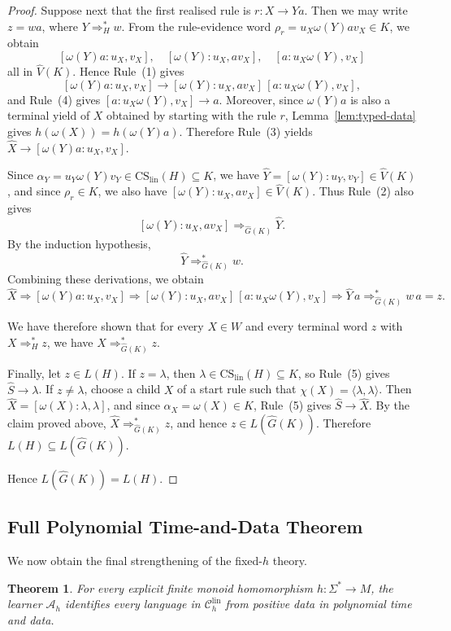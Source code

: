 \documentclass[11pt,a4paper]{article}
\newtheorem{theorem}{Theorem}[section]
\newcommand{\CS}{\mathrm{CS}}
\newcommand{\lin}{\mathrm{lin}}
\newcommand{\Clin}[1]{\mathcal C_{#1}^{\lin}}
\begin{document}
\begin{proof}
Suppose next that the first realised rule is $r:X\to Ya$.
Then we may write $z=wa$, where $Y\Rightarrow_H^* w$.
From the rule-evidence word
$\rho_r=u_X\omega(Y)av_X\in K$, we obtain
\[
[\omega(Y)a:u_X,v_X],\quad
[\omega(Y):u_X,av_X],\quad
[a:u_X\omega(Y),v_X]
\]
all in $\hat V(K)$.
Hence Rule~\textup{(1)} gives
\[
[\omega(Y)a:u_X,v_X]\to
[\omega(Y):u_X,av_X]\,[a:u_X\omega(Y),v_X],
\]
and Rule~\textup{(4)} gives
$[a:u_X\omega(Y),v_X]\to a$.
Moreover, since $\omega(Y)a$ is also a terminal yield of $X$ obtained by
starting with the rule $r$, Lemma~\ref{lem:typed-data} gives
$h(\omega(X))=h(\omega(Y)a)$.
Therefore Rule~\textup{(3)} yields
$\widehat X\to[\omega(Y)a:u_X,v_X]$.

Since $\alpha_Y=u_Y\omega(Y)v_Y\in \CS_{\lin}(H)\subseteq K$,
we have $\widehat Y=[\omega(Y):u_Y,v_Y]\in \hat V(K)$,
and since $\rho_r\in K$, we also have
$[\omega(Y):u_X,av_X]\in \hat V(K)$.
Thus Rule~\textup{(2)} also gives
\[
[\omega(Y):u_X,av_X]
\Rightarrow_{\hat G(K)}
\widehat Y .
\]
By the induction hypothesis,
\[
\widehat Y\Rightarrow_{\hat G(K)}^* w .
\]
Combining these derivations, we obtain
\[
\widehat X
\Rightarrow[\omega(Y)a:u_X,v_X]
\Rightarrow[\omega(Y):u_X,av_X]\,[a:u_X\omega(Y),v_X]
\Rightarrow \widehat Y\,a
\Rightarrow_{\hat G(K)}^* w\,a=z.
\]

We have therefore shown that for every $X\in W$ and every terminal word $z$
with $X\Rightarrow_H^* z$, we have
$\widehat X\Rightarrow_{\hat G(K)}^* z$.

Finally, let $z\in L(H)$.
If $z=\lambda$, then $\lambda\in \CS_{\lin}(H)\subseteq K$,
so Rule~\textup{(5)} gives $\hat S\to\lambda$.
If $z\neq\lambda$, choose a child $X$ of a start rule such that
$\chi(X)=\langle\lambda,\lambda\rangle$.
Then $\widehat X=[\omega(X):\lambda,\lambda]$, and since
$\alpha_X=\omega(X)\in K$, Rule~\textup{(5)} gives
$\hat S\to\widehat X$.
By the claim proved above,
$\widehat X\Rightarrow_{\hat G(K)}^* z$, and hence
$z\in L(\hat G(K))$.
Therefore $L(H)\subseteq L(\hat G(K))$.

Hence $L(\hat G(K))=L(H)$.
\end{proof}

\subsection{Full Polynomial Time-and-Data Theorem}
\label{subsec:linear-poly}

We now obtain the final strengthening of the fixed-$h$ theory.

\begin{theorem}
\label{thm:linear-poly}
For every explicit finite monoid homomorphism $h:\Sigma^*\to M$, the learner
$\mathcal A_h$ identifies every language in $\Clin{h}$ from positive data
in polynomial time and data.
\end{theorem}
\end{document}
